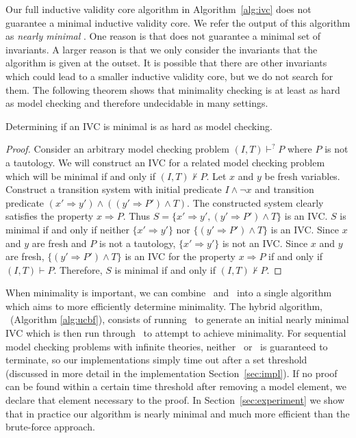 Our full inductive validity core algorithm in Algorithm~\ref{alg:ivc}
does not guarantee a minimal inductive validity core. We refer the output of this algorithm as \emph{nearly minimal} \ivc .
 One reason is
that \reduceinv does not guarantee a minimal set of invariants. A
larger reason is that we only consider the invariants that the
algorithm is given at the outset. It is possible that there are other
invariants which could lead to a smaller inductive validity core, but
we do not search for them. The
following theorem shows that minimality checking is at least as hard
as model checking and therefore undecidable in many settings.

\begin{theorem}
\label{thm:minimal-hard}
Determining if an IVC is minimal is as hard as model checking.
\end{theorem}
\begin{proof}
Consider an arbitrary model checking problem $(I, T)\vdash^? P$ where
$P$ is not a tautology. We will construct an IVC for a related model
checking problem which will be minimal if and only if $(I, T)\nvdash
P$. Let $x$ and $y$ be fresh variables. Construct a transition system
with initial predicate $I\land \neg x$ and transition predicate $(x'
\Rightarrow y') \land ((y' \Rightarrow P') \land T)$. The constructed
system clearly satisfies the property $x \Rightarrow P$. Thus $S = \{x'
\Rightarrow y', (y' \Rightarrow P') \land T\}$ is an IVC. $S$ is
minimal if and only if neither $\{x' \Rightarrow y'\}$ nor $\{(y'
\Rightarrow P') \land T\}$ is an IVC. Since $x$ and $y$ are fresh and
$P$ is not a tautology, $\{x' \Rightarrow y'\}$ is not an IVC. Since
$x$ and $y$ are fresh, $\{(y' \Rightarrow P') \land T\}$ is an IVC for
the property $x \Rightarrow P$ if and only if $(I, T)\vdash P$.
Therefore, $S$ is minimal if and only if $(I, T)\nvdash P$.
\end{proof}

When minimality is important, we can combine \bfalg\ and \ucalg\ into
a single algorithm which aims to more efficiently determine minimality.  The
hybrid algorithm, \ucbfalg\ (Algorithm \ref{alg:ucbf}), consists of running \ucalg\ to generate an
initial nearly minimal IVC which is then run through \bfalg\ to
attempt to achieve minimality.   For sequential model checking problems with infinite theories, neither \bfalg\ or \ucbfalg\ is guaranteed to terminate, so our implementations simply time out after a set threshold (discussed in more detail in the implementation Section~\ref{sec:impl}).  If no proof can be found within a certain time threshold after removing a model element, we declare that element necessary to the proof. In Section~\ref{sec:experiment} we show that in practice our algorithm is nearly
minimal and much more efficient than the brute-force approach.


